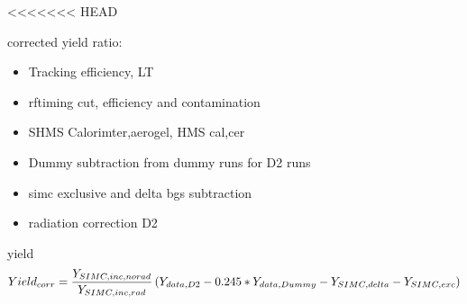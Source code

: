 \documentclass[aspectratio=169,xcolor=dvipsnames]{beamer}
\begin{document}
<<<<<<< HEAD
\begin{frame}{}
corrected yield ratio:
\begin{itemize}
    \item Tracking efficiency, LT
    \item rftiming cut, efficiency and contamination
    \item SHMS Calorimter,aerogel, HMS cal,cer
    \item Dummy subtraction from dummy runs for D2 runs
    \item simc exclusive and delta bgs subtraction
    \item radiation correction D2
\end{itemize}

\end{frame}
\begin{frame}{yield}
    $$Yield_{corr} = \frac{Y_{SIMC,inc,norad}}{Y_{SIMC,inc,rad}} \\
    \left(Y_{data,D2}-0.245*Y_{data,Dummy}-Y_{SIMC,delta}-Y_{SIMC,exc}\right)$$
\end{frame}
%
%

%
%
\end{document}
